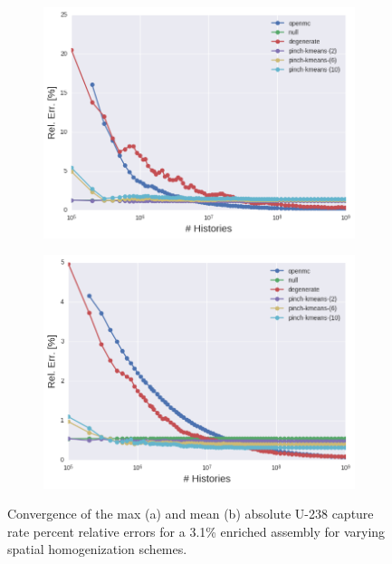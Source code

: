 \clearpage

\begin{figure}[h!]
\centering
\begin{subfigure}{\textwidth}
  \centering
  \includegraphics[width=0.9\linewidth]{figures/results/assm-31/pca-transform/evo-capture-max}
  \caption{}
  \label{fig:chap11-assm-3.1-capture-converge-max}
\end{subfigure}
\begin{subfigure}{\textwidth}
  \centering
  \includegraphics[width=0.9\linewidth]{figures/results/assm-31/pca-transform/evo-capture-mean}
  \caption{}
  \label{fig:chap11-assm-3.1-capture-converge-mean}
\end{subfigure}
\vspace{2mm}
\caption[Fission rate covergence for a 3.1\% enriched assembly]{Convergence of the max (a) and mean (b) absolute U-238 capture rate percent relative errors for a 3.1\% enriched assembly for varying spatial homogenization schemes.}
\label{fig:chap11-assm-3.1-capture-converge}
\end{figure}

